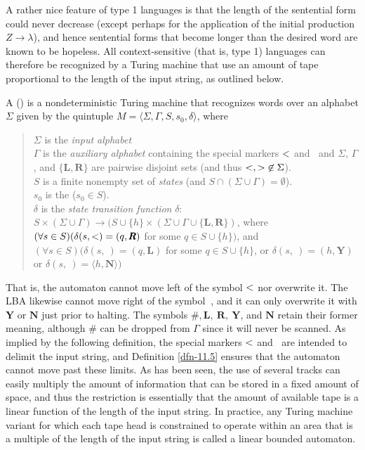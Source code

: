 A rather nice feature of type 1 languages is that the length of the sentential
form could never decrease (except perhaps for the application of the initial
production $Z\rightarrow\lambda$), and hence sentential forms that become
longer than the desired word are known to be hopeless. All context-sensitive
(that is, type 1) languages can therefore be recognized by a Turing machine that
use an amount of tape proportional to the length of the input string, as
outlined below.

\begin{dfn}\label{dfn-11.5}
A \emph{} () is a nondeterministic
Turing machine that recognizes words over an alphabet $\Sigma$ given by the
quintuple $M=\langle\Sigma,\Gamma,S,s_0,\delta\rangle$, where
\begin{quote}
$\Sigma$ is the \emph{input alphabet} \\
$\Gamma$ is the \emph{auxiliary alphabet} containing the special markers $\text{\textless}$ and
	$\>$ and $\Sigma$, $\Gamma$, and $\{\pmb{L},\pmb{R}\}$ are pairwise
	disjoint sets (and thus $\text{\textless},\text{\textgreater} \not \in\Sigma$). \\
$S$ is a finite nonempty set of \emph{states} (and $S\cap(\Sigma\cup\Gamma) =
	\emptyset$). \\
$s_0$ is the \emph{} ($s_0\in S$). \\
$\delta$ is the \emph{state transition function} $\delta$: $S\times(\Sigma\cup
	\Gamma)\rightarrow(S\cup\{h\}\times(\Sigma\cup\Gamma\cup\{\pmb{L},
	\pmb{R}\})$, where \\
$(\forall s\in S)(\delta(s,\text{\textless})=(q,\pmb{R})$ for some $q\in S\cup\{h\})$, and \\
$(\forall s\in S)(\delta(s,\>)=(q,\pmb{L})$ for some $q\in S\cup\{h\}$, or
$\delta(s,\>)=(h,\pmb{Y})$ or $\delta(s,\>)=\langle h,\pmb{N}\rangle)$
\end{quote}
\end{dfn}
That is, the automaton cannot move left of the symbol $\text{\textless}$ nor overwrite it. The
LBA likewise cannot move right of the symbol $\>$, and it can only overwrite it
with $\pmb{Y}$ or $\pmb{N}$ just prior to halting. The symbols $\#,\pmb{L},\ 
\pmb{R},\ \pmb{Y}$, and $\pmb{N}$ retain their former meaning, although $\#$ can
be dropped from $\Gamma$ since it will never be scanned. As implied by the
following definition, the special markers $\text{\textless}$ and $\>$ are intended to delimit
the input string, and Definition \ref{dfn-11.5} ensures that the automaton cannot move
past these limits. As has been seen, the use of several tracks can easily
multiply the amount of information that can be stored in a fixed amount of
space, and thus the restriction is essentially that the amount of available tape
is a linear function of the length of the input string. In practice, any Turing
machine variant for which each tape head is constrained to operate within an
area that is a multiple of the length of the input string is called a linear
bounded automaton.

